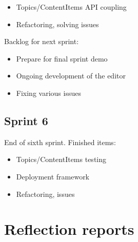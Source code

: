 \documentclass[10pt,a4paper]{article}
\begin{document}
\begin{appendices}
{        \begin{itemize}
          \item Topics/ContentItems API coupling
          \item Refactoring, solving issues
        \end{itemize}

        Backlog for next sprint:

        \begin{itemize}
          \item Prepare for final sprint demo
          \item Ongoing development of the editor
          \item Fixing various issues
        \end{itemize}

      \subsection*{Sprint 6}
        End of sixth sprint. Finished items:
        
        \begin{itemize}
          \item Topics/ContentItems testing
          \item Deployment framework
          \item Refactoring, issues
        \end{itemize}
    }

    \section{Reflection reports}
  \end{appendices}
\end{document}
